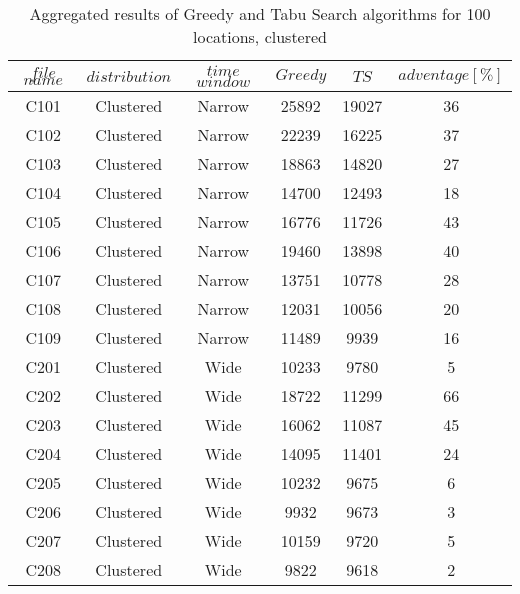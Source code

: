 \begin{table}[t]
\centering
\caption{
Aggregated results of Greedy and Tabu Search algorithms for 100 locations, clustered}
\begin{tabular*}{0.8\linewidth}{@{\extracolsep{\fill}}cccccc}
\toprule
$file$ $name$ & $distribution$ & $time$ $window$ & $Greedy$ & $TS$ & $adventage[\%]$ \\ \midrule
C101 & Clustered & Narrow & 25892 & 19027 & 36\\
C102 & Clustered & Narrow & 22239 & 16225 & 37\\
C103 & Clustered & Narrow & 18863 & 14820 & 27\\
C104 & Clustered & Narrow & 14700 & 12493 & 18\\
C105 & Clustered & Narrow & 16776 & 11726 & 43\\
C106 & Clustered & Narrow & 19460 & 13898 & 40\\
C107 & Clustered & Narrow & 13751 & 10778 & 28\\
C108 & Clustered & Narrow & 12031 & 10056 & 20\\
C109 & Clustered & Narrow & 11489 & 9939 & 16\\
C201 & Clustered & Wide & 10233 & 9780 & 5\\
C202 & Clustered & Wide & 18722 & 11299 & 66\\
C203 & Clustered & Wide & 16062 & 11087 & 45\\
C204 & Clustered & Wide & 14095 & 11401 & 24\\
C205 & Clustered & Wide & 10232 & 9675 & 6\\
C206 & Clustered & Wide & 9932 & 9673 & 3\\
C207 & Clustered & Wide & 10159 & 9720 & 5\\
C208 & Clustered & Wide & 9822 & 9618 & 2\\
\end{tabular*}\end{table}